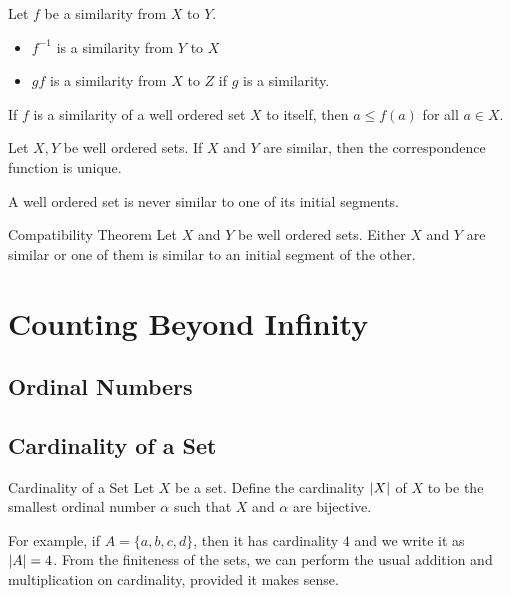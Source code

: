 \documentclass[a4paper]{article}
\begin{document}
\begin{prp}{}{} Let $f$ be a similarity from $X$ to $Y$. 
\begin{itemize}
\item $f^{-1}$ is a similarity from $Y$ to $X$
\item $gf$ is a similarity from $X$ to $Z$ if $g$ is a similarity. 
\end{itemize}
\end{prp}

\begin{thm}{}{} If $f$ is a similarity of a well ordered set $X$ to itself, then $a\leq f(a)$ for all $a\in X$. 
\end{thm}

\begin{thm}{}{} Let $X,Y$ be well ordered sets. If $X$ and $Y$ are similar, then the correspondence function is unique. 
\end{thm}

\begin{thm}{}{} A well ordered set is never similar to one of its initial segments. 
\end{thm}

\begin{thm}{Compatibility Theorem}{} Let $X$ and $Y$ be well ordered sets. Either $X$ and $Y$ are similar or one of them is similar to an initial segment of the other. 
\end{thm}

\pagebreak
\section{Counting Beyond Infinity}
\subsection{Ordinal Numbers}

\subsection{Cardinality of a Set}
\begin{defn}{Cardinality of a Set}{} Let $X$ be a set. Define the cardinality $\abs{X}$ of $X$ to be the smallest ordinal number $\alpha$ such that $X$ and $\alpha$ are bijective. 
\end{defn}

For example, if $A=\{a,b,c,d\}$, then it has cardinality $4$ and we write it as $\abs{A}=4$. From the finiteness of the sets, we can perform the usual addition and multiplication on cardinality, provided it makes sense. 
\end{document}
